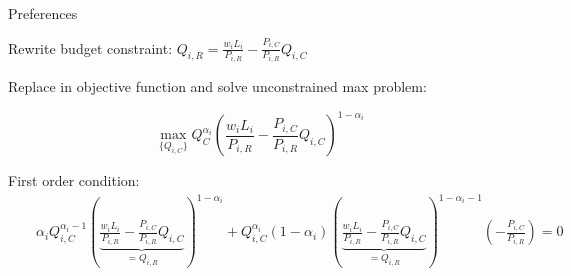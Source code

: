 \documentclass[notes,11pt, aspectratio=169, xcolor=table]{beamer}
\newenvironment{wideitemize}{\itemize\addtolength{\itemsep}{10pt}}{\enditemize}
\begin{document}
\begin{frame}{Preferences}
\begin{wideitemize}
        \item<4> Rewrite budget constraint: $Q_{i,R} = \frac{w_i L_i}{P_{i,R}} - \frac{P_{i,C}}{P_{i,R} } Q_{i,C}$
        \item<2-> Replace in objective function and solve unconstrained max problem:

        \begin{equation*}
            \max_{\{Q_{i,C} \}} Q_C^{\alpha_i} \left( \frac{w_i L_i}{P_{i,R}} - \frac{P_{i,C}}{P_{i,R} } Q_{i,C} \right)^{1-\alpha_i}
        \end{equation*}
        \item<3-> First order condition: 
\scriptsize{
\begin{eqnarray*}
    & & \alpha_i Q_{i,C}^{\alpha_i-1} \left( \underbrace{\frac{w_i L_i}{P_{i,R}} - \frac{P_{i,C}}{P_{i,R} } Q_{i,C}}_{=Q_{i,R}} \right)^{1-\alpha_i} + Q_{i,C}^{\alpha_i} (1-\alpha_i) \left( \underbrace{\frac{w_i L_i}{P_{i,R}} - \frac{P_{i,C}}{P_{i,R} } Q_{i,C}}_{=Q_{i,R}} \right)^{1-\alpha_i-1} \left( - \frac{P_{i,C}}{P_{i,R}}\right) = 0 \\
\end{eqnarray*}
}
\normalsize
\begin{center}
\end{center}

        \end{wideitemize}
\end{frame}
\end{document}
